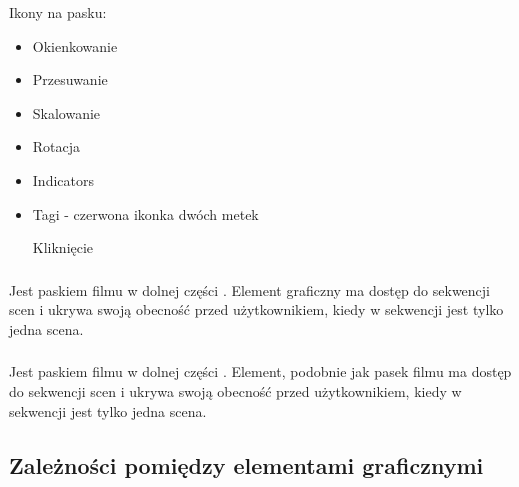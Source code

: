 Ikony na pasku:
\begin{itemize}
    \item Okienkowanie
    \item Przesuwanie
    \item Skalowanie
    \item Rotacja
    \item Indicators
    \item Tagi - czerwona ikonka dwóch metek

    Kliknięcie 
\end{itemize}

\subsubsection{}
\label{sec:sokar-dicomgraphics}

\subsubsection{}
\label{sec:sokar-moviebar}

Jest paskiem filmu w dolnej części .
Element graficzny ma dostęp do sekwencji scen i ukrywa swoją obecność przed użytkownikiem, kiedy w sekwencji jest tylko jedna scena.

\subsubsection{}
\label{sec:sokar-framechooser}

Jest paskiem filmu w dolnej części .
Element, podobnie jak pasek filmu ma dostęp do sekwencji scen i ukrywa swoją obecność przed użytkownikiem, kiedy w sekwencji jest tylko jedna scena.

\subsection{Zależności pomiędzy elementami graficznymi}